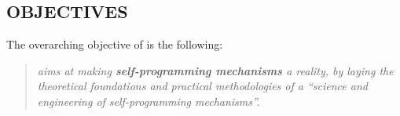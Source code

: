 
\subsection*{OBJECTIVES}


The overarching objective of \project is the following:

\begin{quote}\textit{
\project aims at making \textbf{self-programming mechanisms} a reality, by laying the theoretical foundations and practical
methodologies of a ``science and engineering of self-programming mechanisms''.
}
\end{quote}



